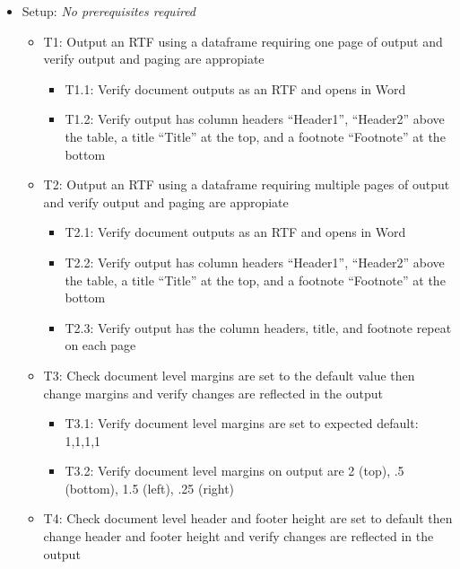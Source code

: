 \documentclass[]{article}
\providecommand{\tightlist}{%
  \setlength{\itemsep}{0pt}\setlength{\parskip}{0pt}}
\begin{document}
\begin{itemize}
\item
  Setup: \emph{No prerequisites required}

  \begin{itemize}
  \tightlist
  \item
    T1: Output an RTF using a dataframe requiring one page of output and
    verify output and paging are appropiate

    \begin{itemize}
    \tightlist
    \item
      T1.1: Verify document outputs as an RTF and opens in Word
    \item
      T1.2: Verify output has column headers ``Header1'', ``Header2''
      above the table, a title ``Title'' at the top, and a footnote
      ``Footnote'' at the bottom
    \end{itemize}
  \item
    T2: Output an RTF using a dataframe requiring multiple pages of
    output and verify output and paging are appropiate

    \begin{itemize}
    \tightlist
    \item
      T2.1: Verify document outputs as an RTF and opens in Word
    \item
      T2.2: Verify output has column headers ``Header1'', ``Header2''
      above the table, a title ``Title'' at the top, and a footnote
      ``Footnote'' at the bottom
    \item
      T2.3: Verify output has the column headers, title, and footnote
      repeat on each page
    \end{itemize}
  \item
    T3: Check document level margins are set to the default value then
    change margins and verify changes are reflected in the output

    \begin{itemize}
    \tightlist
    \item
      T3.1: Verify document level margins are set to expected default:
      1,1,1,1
    \item
      T3.2: Verify document level margins on output are 2 (top), .5
      (bottom), 1.5 (left), .25 (right)
    \end{itemize}
  \item
    T4: Check document level header and footer height are set to default
    then change header and footer height and verify changes are
    reflected in the output


\end{itemize}
\end{itemize}
\end{document}
